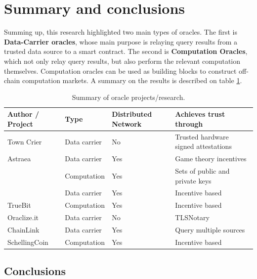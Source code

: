 \section{Summary and conclusions}

Summing up, this research highlighted two main types of oracles. The first is \textbf{Data-Carrier oracles}, whose main purpose is relaying query results from a trusted data source to a smart contract. The second is \textbf{Computation Oracles}, which not only relay query results, but also perform the relevant computation themselves. Computation oracles can be used as building blocks to construct off-chain computation markets. A summary on the results is described on table \ref{oracle-summary}.

\begin{table}[]
\centering
\begin{tabular}{llll}
\hline
Author / Project                   & Type         & Distributed Network & Achieves trust through               \\ \hline
Town Crier                         & Data carrier & No                  & Trusted hardware signed attestations \\
Astraea                            & Data carrier & Yes                 & Game theory incentives               \\
\cite{Gordon2017ProvenanceSensorsb}       & Computation  & Yes                 & Sets of public and private keys      \\
\cite{MontotoMonroy2018BitcoinBlockchain} & Data carrier & Yes                 & Incentive based                          \\
TrueBit                            & Computation  & Yes                 & Incentive based                      \\
Oraclize.it                        & Data carrier & No                  & TLSNotary                            \\
ChainLink                          & Data carrier & Yes                 & Query multiple sources               \\
SchellingCoin                      & Computation  & Yes                 & Incentive based                      \\ \hline
\end{tabular}
\caption{Summary of oracle projects/research.}
\label{oracle-summary}
\end{table}

\subsection{Conclusions}

